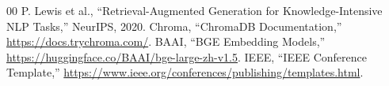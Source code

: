 \documentclass[conference]{IEEEtran}
\begin{document}
\begin{thebibliography}{00}
P. Lewis et al., ``Retrieval-Augmented Generation for Knowledge-Intensive NLP Tasks,''
NeurIPS, 2020.
Chroma, ``ChromaDB Documentation,'' \url{https://docs.trychroma.com/}.
BAAI, ``BGE Embedding Models,'' \url{https://huggingface.co/BAAI/bge-large-zh-v1.5}.
IEEE, ``IEEE Conference Template,'' \url{https://www.ieee.org/conferences/publishing/templates.html}.
\end{thebibliography}
\end{document}
